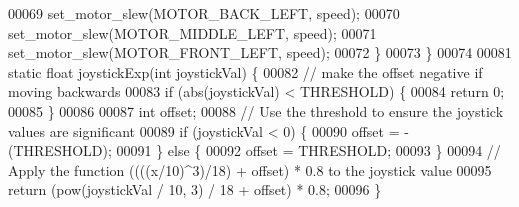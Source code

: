 \begin{DoxyCode}
00069     set_motor_slew(MOTOR_BACK_LEFT, speed);
00070     set_motor_slew(MOTOR_MIDDLE_LEFT, speed);
00071     set_motor_slew(MOTOR_FRONT_LEFT, speed);
00072   \}
00073 \}
00074 
00081 \textcolor{keyword}{static} \textcolor{keywordtype}{float} joystickExp(\textcolor{keywordtype}{int} joystickVal) \{
00082   \textcolor{comment}{// make the offset negative if moving backwards}
00083   \textcolor{keywordflow}{if} (abs(joystickVal) < THRESHOLD) \{
00084     \textcolor{keywordflow}{return} 0;
00085   \}
00086 
00087   \textcolor{keywordtype}{int} offset;
00088   \textcolor{comment}{// Use the threshold to ensure the joystick values are significant}
00089   \textcolor{keywordflow}{if} (joystickVal < 0) \{
00090     offset = -(THRESHOLD);
00091   \} \textcolor{keywordflow}{else} \{
00092     offset = THRESHOLD;
00093   \}
00094   \textcolor{comment}{// Apply the function ((((x/10)^3)/18) + offset) * 0.8 to the joystick value}
00095   \textcolor{keywordflow}{return} (pow(joystickVal / 10, 3) / 18 + offset) * 0.8;
00096 \}
\end{DoxyCode}
